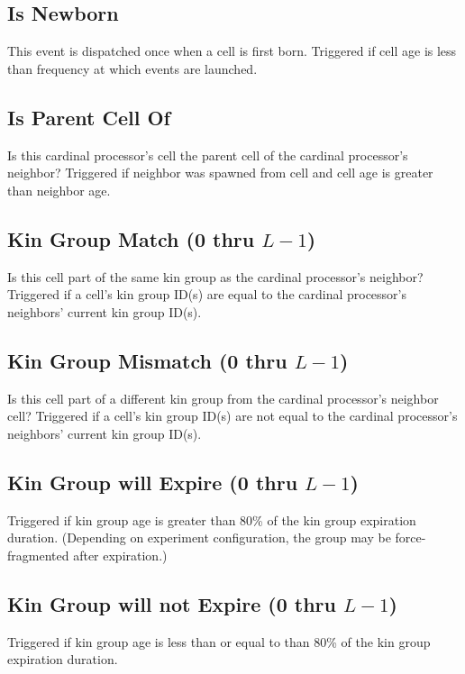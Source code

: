 \subsection{Is Newborn}

This event is dispatched once when a cell is first born.
Triggered if cell age is less than frequency at which events are launched.

\subsection{Is Parent Cell Of}

Is this cardinal processor's cell the parent cell of the cardinal processor's neighbor?
Triggered if neighbor was spawned from cell and cell age is greater than neighbor age.

\subsection{Kin Group Match (0 thru $L-1$)}

Is this cell part of the same kin group as the cardinal processor's neighbor?
Triggered if a cell's kin group ID(s) are equal to the cardinal processor's neighbors' current kin group ID(s).

\subsection{Kin Group Mismatch (0 thru $L-1$)}

Is this cell part of a different kin group from the cardinal processor's neighbor cell?
Triggered if a cell's kin group ID(s) are not equal to the cardinal processor's neighbors' current kin group ID(s).

\subsection{Kin Group will Expire (0 thru $L-1$)}

Triggered if kin group age is greater than 80\% of the kin group expiration duration.
(Depending on experiment configuration, the group may be force-fragmented after expiration.)

\subsection{Kin Group will not Expire (0 thru $L-1$)}

Triggered if kin group age is less than or equal to than 80\% of the kin group expiration duration.

